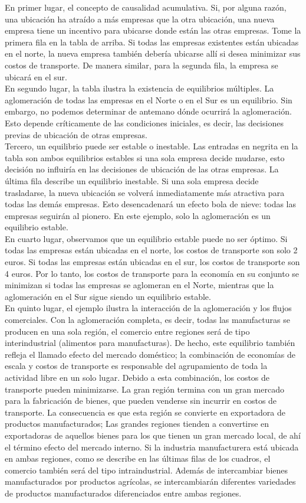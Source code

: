 En primer lugar, el concepto de causalidad acumulativa. Si, por alguna razón, una ubicación ha atraído a más empresas que la otra ubicación, una nueva empresa tiene un incentivo para ubicarse donde están las otras empresas. Tome la primera fila en la tabla de arriba. Si todas las empresas existentes están ubicadas en el norte, la nueva empresa también debería ubicarse allí si desea minimizar sus costos de transporte. De manera similar, para la segunda fila,  la empresa se ubicará en el sur.\\
En segundo lugar, la tabla  ilustra la existencia de equilibrios múltiples. La aglomeración de todas las empresas en el Norte o en el Sur es un equilibrio. Sin embargo, no podemos determinar de antemano dónde ocurrirá la aglomeración. Esto depende críticamente de las condiciones iniciales, es decir, las decisiones previas de ubicación de otras empresas.\\
Tercero, un equilibrio puede ser estable o inestable. Las entradas en negrita en la tabla  son ambos equilibrios estables si una sola empresa decide mudarse, esto decisión no influiría en las decisiones de ubicación de las otras empresas. La última fila  describe un equilibrio inestable. Si una sola empresa decide trasladarse, la nueva ubicación se volverá inmediatamente más atractiva para todas las demás empresas. Esto desencadenará un efecto bola de nieve: todas las empresas seguirán al pionero. En este ejemplo, solo la aglomeración es un equilibrio estable.\\
En cuarto lugar, observamos que un equilibrio estable puede no ser óptimo. Si todas las empresas están ubicadas en el norte, los costos de transporte son solo 2 euros. Si todas las empresas están ubicadas en el sur, los costos de transporte son 4 euros.  Por lo tanto, los costos de transporte para la economía en su conjunto se minimizan si todas las empresas se aglomeran en el Norte, mientras que la aglomeración en el Sur sigue siendo un equilibrio estable.\\
En quinto lugar, el ejemplo ilustra la interacción de la aglomeración y los flujos comerciales. Con la aglomeración completa, es decir, todas las manufacturas se producen en una sola región, el comercio entre regiones será de tipo interindustrial (alimentos para manufacturas). De hecho, este equilibrio también refleja el llamado efecto del mercado doméstico; la combinación de economías de escala y costos de transporte es responsable del agrupamiento de toda la actividad libre en un solo lugar. Debido a esta combinación, los costos de transporte pueden minimizarse. La gran región termina con un gran mercado para la fabricación de bienes, que pueden venderse sin incurrir en costos de transporte. La consecuencia es que esta región se convierte en exportadora de productos manufacturados; Las grandes regiones tienden a convertirse en exportadoras de aquellos bienes para los que tienen un gran mercado local, de ahí el término efecto del mercado interno. Si la industria manufacturera está ubicada en ambas regiones, como se describe en las últimas filas de los cuadros, el comercio también será del tipo intraindustrial. Además de intercambiar bienes manufacturados por productos agrícolas, se intercambiarán diferentes variedades de productos manufacturados diferenciados entre ambas regiones.\\
